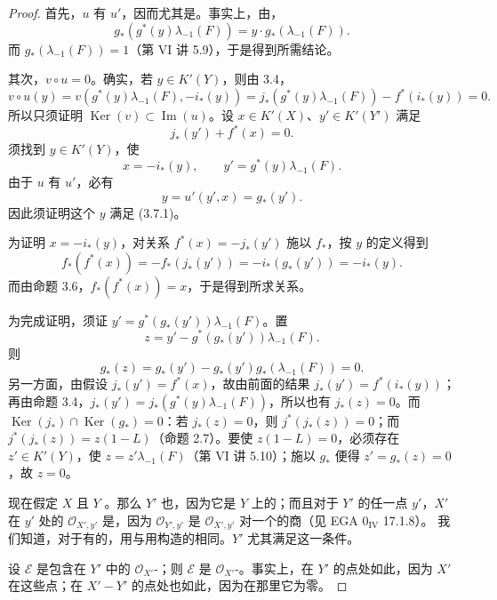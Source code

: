 \begin{proof}
首先，$u$ 有 $u'$，因而尤其是。事实上，由，
\[
g_*(g^*(y)\lambda_{-1}(F))=y\cdot g_*(\lambda_{-1}(F)).
\]
而 $g_*(\lambda_{-1}(F))=1$（第 VI 讲 5.9），于是得到所需结论。

其次，$v\circ u=0$。确实，若 $y\in K'(Y)$，则由 3.4，
\[
v\circ u(y)=v(g^*(y)\lambda_{-1}(F),-i_*(y))
=j_*(g^*(y)\lambda_{-1}(F))-f^*(i_*(y))=0.
\]
所以只须证明 $\operatorname{Ker}(v)\subset\operatorname{Im}(u)$。设 $x\in K'(X)$、$y'\in K'(Y')$ 满足
\[
j_*(y')+f^*(x)=0.
\]
须找到 $y\in K'(Y)$，使
\[
x=-i_*(y),\qquad y'=g^*(y)\lambda_{-1}(F).\tag{3.7.1}
\]
由于 $u$ 有 $u'$，必有
\[
y=u'(y',x)=g_*(y').
\]
因此须证明这个 $y$ 满足 (3.7.1)。

为证明 $x=-i_*(y)$，对关系 $f^*(x)=-j_*(y')$ 施以 $f_*$，按 $y$ 的定义得到
\[
f_*(f^*(x))=-f_*(j_*(y'))=-i_*(g_*(y'))=-i_*(y).
\]
而由命题 3.6，$f_*(f^*(x))=x$，于是得到所求关系。

为完成证明，须证 $y'=g^*(g_*(y'))\lambda_{-1}(F)$。置
\[
z=y'-g^*(g_*(y'))\lambda_{-1}(F).
\]
则
\[
g_*(z)=g_*(y')-g_*(y')g_*(\lambda_{-1}(F))=0.
\]
另一方面，由假设 $j_*(y')=f^*(x)$，故由前面的结果 $j_*(y')=f^*(i_*(y))$；再由命题 3.4，$j_*(y')=j_*(g^*(y)\lambda_{-1}(F))$，所以也有 $j_*(z)=0$。而 $\operatorname{Ker}(j_*)\cap\operatorname{Ker}(g_*)=0$：若 $j_*(z)=0$，则 $j^*(j_*(z))=0$；而 $j^*(j_*(z))=z(1-L)$（命题 2.7）。要使 $z(1-L)=0$，必须存在 $z'\in K'(Y)$，使 $z=z'\lambda_{-1}(F)$（第 VI 讲 5.10）；施以 $g_*$ 便得 $z'=g_*(z)=0$，故 $z=0$。

现在假定 $X$ 且 $Y$ 。那么 $Y'$ 也，因为它是 $Y$ 上的；而且对于 $Y'$ 的任一点 $y'$，$X'$ 在 $y'$ 处的 $\mathcal O_{X',y'}$ 是，因为 $\mathcal O_{Y',y'}$ 是 $\mathcal O_{X',y'}$ 对一个的商（见 EGA $0_{\mathrm{IV}}$ 17.1.8）。
我们知道，对于有的，用与用构造的相同。$Y'$ 尤其满足这一条件。

设 $\mathcal E$ 是包含在 $Y'$ 中的 $\mathcal O_{X'}$-；则 $\mathcal E$ 是 $\mathcal O_{X'}$-。事实上，在 $Y'$ 的点处如此，因为 $X'$ 在这些点；在 $X'-Y'$ 的点处也如此，因为在那里它为零。


\end{proof}
